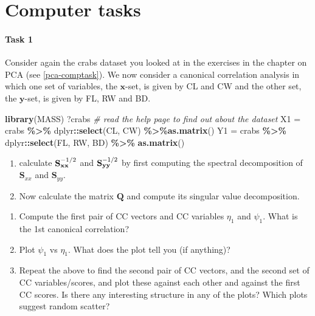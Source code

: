 \documentclass[
]{book}
\newenvironment{Shaded}{\begin{snugshade}}{\end{snugshade}}
\newcommand{\CommentTok}[1]{\textcolor[rgb]{0.56,0.35,0.01}{\textit{#1}}}
\newcommand{\FunctionTok}[1]{\textcolor[rgb]{0.13,0.29,0.53}{\textbf{#1}}}
\newcommand{\NormalTok}[1]{#1}
\newcommand{\OtherTok}[1]{\textcolor[rgb]{0.56,0.35,0.01}{#1}}
\newcommand{\SpecialCharTok}[1]{\textcolor[rgb]{0.81,0.36,0.00}{\textbf{#1}}}
\theoremstyle{definition}
\theoremstyle{definition}
\theoremstyle{definition}
\theoremstyle{definition}
\theoremstyle{remark}
\begin{document}
\section{Computer tasks}\label{computer-tasks-1}

\paragraph*{Task 1}\label{task-1}

Consider again the crabs dataset you looked at in the exercises in the chapter on PCA (see \ref{pca-comptask}).
We now consider a canonical correlation analysis in which one set of variables, the \(\mathbf x\)-set, is given by CL and CW and the
other set, the \(\mathbf y\)-set, is given by FL, RW and BD.

\begin{Shaded}
\begin{Highlighting}[]
\FunctionTok{library}\NormalTok{(MASS)}
\NormalTok{?crabs           }\CommentTok{\# read the help page to find out about the dataset}
\NormalTok{X1 }\OtherTok{=}\NormalTok{ crabs }\SpecialCharTok{\%\textgreater{}\%}\NormalTok{ dplyr}\SpecialCharTok{::}\FunctionTok{select}\NormalTok{(CL, CW)  }\SpecialCharTok{\%\textgreater{}\%}\FunctionTok{as.matrix}\NormalTok{()  }
\NormalTok{Y1 }\OtherTok{=}\NormalTok{ crabs }\SpecialCharTok{\%\textgreater{}\%}\NormalTok{ dplyr}\SpecialCharTok{::}\FunctionTok{select}\NormalTok{(FL, RW, BD) }\SpecialCharTok{\%\textgreater{}\%} \FunctionTok{as.matrix}\NormalTok{()            }
\end{Highlighting}
\end{Shaded}

\begin{enumerate}
\def\labelenumi{\roman{enumi}.}
\item
  calculate \({\bf S}_{\bf x x}^{-1/2}\) and \({\bf S}_{\bf yy}^{-1/2}\) by first computing the spectral decomposition of \(\mathbf S_{xx}\) and \(\mathbf S_{yy}\).
\item
  Now calculate the matrix \(\mathbf Q\) and compute its singular value decomposition.
\end{enumerate}

\begin{enumerate}
\def\labelenumi{\roman{enumi}.}
\setcounter{enumi}{2}
\item
  Compute the first pair of CC vectors and CC variables \(\eta_1\) and \(\psi_1\). What is the 1st canonical correlation?
\item
  Plot \(\psi_1\) vs \(\eta_1\). What does the plot tell you (if anything)?
\item
  Repeat the above to find the second pair of CC vectors, and the second set of CC variables/scores, and plot these against each other and against the first CC scores. Is there any interesting structure in any of the plots? Which plots suggest random scatter?
\end{enumerate}
\end{document}
